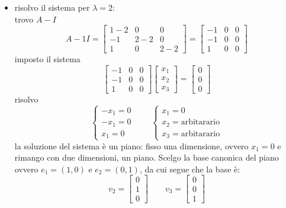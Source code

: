 \documentclass[italian]{article}
\begin{document}
\begin{enumerate}[label=\textbf{\alph*)}]
\begin{itemize}
			\item risolvo il sistema per $\lambda=2$:\\[2mm]
			trovo $A - I$
			\[
				A - 1I =
				\begin{bmatrix}
					1-2 & 0 & 0 \\
					-1 & 2-2 & 0 \\
					1 & 0 & 2-2
				\end{bmatrix}
				=
				\begin{bmatrix}
					-1 & 0 & 0 \\
					-1 & 0 & 0 \\
					1 & 0 & 0
				\end{bmatrix}
			\]
			imposto il sistema
			\[
				\begin{bmatrix}
					-1 & 0 & 0 \\
					-1 & 0 & 0 \\
					1 & 0 & 0
				\end{bmatrix}
				\begin{bmatrix}
					x_1 \\ x_2 \\ x_3
				\end{bmatrix}
				=
				\begin{bmatrix}
					0 \\ 0 \\ 0
				\end{bmatrix}
			\]
			risolvo
			\[
				\begin{cases*}
					-x_1 = 0\\
					-x_1 = 0 \\
					x_1 = 0
				\end{cases*}
				\qquad
				\begin{cases*}
					x_1 = 0 \\
					x_2 = \text{arbitarario}\\
					x_3 = \text{arbitarario}
				\end{cases*}
			\]
			la soluzione del sistema è un piano: fisso una dimensione, ovvero $x_1 = 0$ e rimango con due dimensioni, un piano. Scelgo la base canonica del piano ovvero $e_1 = (1,0)$ e $e_2 = (0,1)$, da cui segue che la base è:
			\[ 
				v_2=
				\begin{bmatrix}
					0 \\ 1 \\ 0
				\end{bmatrix}
				\qquad
				v_3 =
				\begin{bmatrix}
					0 \\ 0 \\ 1
				\end{bmatrix}
\]
\end{itemize}
\end{enumerate}
\end{document}

